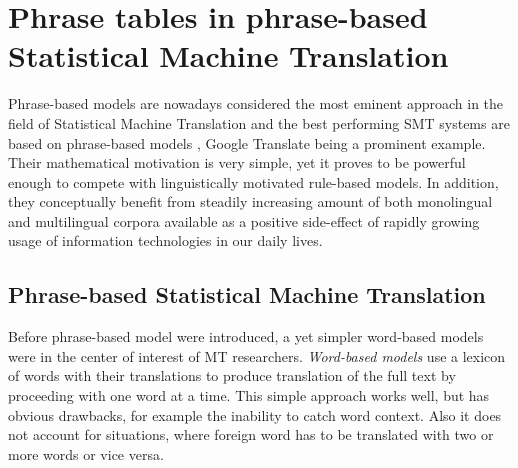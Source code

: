 
\chapter{Phrase tables in phrase-based Statistical Machine Translation}
\label{chap:phrase-based}


Phrase-based models are nowadays considered the most eminent approach in
the field of Statistical Machine Translation and the best performing
SMT systems are based on phrase-based models \citep{koehn:smt},
Google Translate being a prominent example.
Their mathematical motivation is very simple, yet it proves to be powerful enough
to compete with linguistically motivated rule-based models.
In addition, they conceptually benefit from steadily increasing amount of both
monolingual and multilingual corpora available as a positive side-effect of rapidly
growing usage of information technologies in our daily lives.

\section{Phrase-based Statistical Machine Translation}

Before phrase-based model were introduced, a yet simpler word-based models were in
the center of interest of MT researchers. \emph{Word-based models} use a lexicon
of words with their translations to produce translation of the full text by proceeding
with one word at a time.
This simple approach works well, but has obvious drawbacks,
for example the inability to catch word context.
Also it does not account for situations, where foreign word has to be translated
with two or more words or vice versa.

